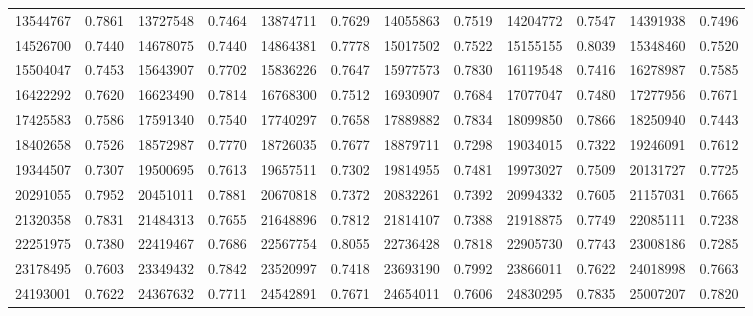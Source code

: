 \documentclass[12pt]{article}
\begin{document}
\begin{longtable}{@{}
        S[table-format=8.0] c
        S[table-format=8.0] c
        S[table-format=8.0] c
        S[table-format=8.0] c
        S[table-format=8.0] c
        S[table-format=8.0] c @{}}
        \num{13544767}&0.7861 & \num{13727548}&0.7464 & \num{13874711}&0.7629 &
        \num{14055863}&0.7519 & \num{14204772}&0.7547 & \num{14391938}&0.7496 \\
        \num{14526700}&0.7440 & \num{14678075}&0.7440 & \num{14864381}&0.7778 &
        \num{15017502}&0.7522 & \num{15155155}&0.8039 & \num{15348460}&0.7520 \\
        \num{15504047}&0.7453 & \num{15643907}&0.7702 & \num{15836226}&0.7647 &
        \num{15977573}&0.7830 & \num{16119548}&0.7416 & \num{16278987}&0.7585 \\
        \num{16422292}&0.7620 & \num{16623490}&0.7814 & \num{16768300}&0.7512 &
        \num{16930907}&0.7684 & \num{17077047}&0.7480 & \num{17277956}&0.7671 \\
        \num{17425583}&0.7586 & \num{17591340}&0.7540 & \num{17740297}&0.7658 &
        \num{17889882}&0.7834 & \num{18099850}&0.7866 & \num{18250940}&0.7443 \\
        \num{18402658}&0.7526 & \num{18572987}&0.7770 & \num{18726035}&0.7677 &
        \num{18879711}&0.7298 & \num{19034015}&0.7322 & \num{19246091}&0.7612 \\
        \num{19344507}&0.7307 & \num{19500695}&0.7613 & \num{19657511}&0.7302 &
        \num{19814955}&0.7481 & \num{19973027}&0.7509 & \num{20131727}&0.7725 \\
        \num{20291055}&0.7952 & \num{20451011}&0.7881 & \num{20670818}&0.7372 &
        \num{20832261}&0.7392 & \num{20994332}&0.7605 & \num{21157031}&0.7665 \\
        \num{21320358}&0.7831 & \num{21484313}&0.7655 & \num{21648896}&0.7812 &
        \num{21814107}&0.7388 & \num{21918875}&0.7749 & \num{22085111}&0.7238 \\
        \num{22251975}&0.7380 & \num{22419467}&0.7686 & \num{22567754}&0.8055 &
        \num{22736428}&0.7818 & \num{22905730}&0.7743 & \num{23008186}&0.7285 \\
        \num{23178495}&0.7603 & \num{23349432}&0.7842 & \num{23520997}&0.7418 &
        \num{23693190}&0.7992 & \num{23866011}&0.7622 & \num{24018998}&0.7663 \\
        \num{24193001}&0.7622 & \num{24367632}&0.7711 & \num{24542891}&0.7671 &
        \num{24654011}&0.7606 & \num{24830295}&0.7835 & \num{25007207}&0.7820 \\
    \end{longtable}
    \endgroup
\end{document}
